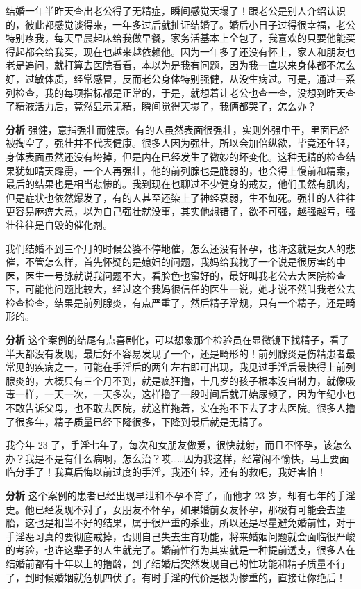 \begin{case}[不孕不育]
    结婚一年半昨天查出老公得了无精症，瞬间感觉天塌了！跟老公是别人介绍认识的，彼此都感觉谈得来，一年多过后就扯证结婚了。婚后小日子过得很幸福，老公特别疼我，每天早晨起床给我做早餐，家务活基本上全包了，我喜欢的只要他能买得起都会给我买，现在也越来越依赖他。因为一年多了还没有怀上，家人和朋友也老是追问，就打算去医院看看，本以为是我有问题，因为我一直以来身体都不怎么好，过敏体质，经常感冒，反而老公身体特别强健，从没生病过。可是，通过一系列检查，我的每项指标都是正常的，于是，就想着让老公也查一查，没想到昨天查了精液活力后，竟然显示无精，瞬间觉得天塌了，我俩都哭了，怎么办？

    \textbf{分析} 强健，意指强壮而健康。有的人虽然表面很强壮，实则外强中干，里面已经被掏空了，强壮并不代表健康。很多人因为强壮，所以会加倍纵欲，毕竟还年轻，身体表面虽然还没有垮掉，但是内在已经发生了微妙的坏变化。这种无精的检查结果犹如晴天霹雳，一个人再强壮，他的前列腺也是脆弱的，也会得上慢前和精索，最后的结果也是相当悲惨的。我到现在也聊过不少健身的戒友，他们虽然有肌肉，但是症状也依然爆发了，有的人甚至还染上了神经衰弱，生不如死。强壮的人往往更容易麻痹大意，以为自己强壮就没事，其实他想错了，欲不可强，越强越亏，强壮往往是自毁的催化剂。
\end{case}

\begin{case}[不孕不育]
    我们结婚不到三个月的时候公婆不停地催，怎么还没有怀孕，也许这就是女人的悲催，不管怎么样，首先怀疑的是媳妇的问题，我妈给我找了一个说是很厉害的中医，医生一号脉就说我问题不大，看脸色也蛮好的，最好叫我老公去大医院检查下，可能他问题比较大，经过这个我妈很信任的医生一说，她才说不然叫我老公去检查检查，结果是前列腺炎，有点严重了，然后精子常规，只有一个精子，还是畸形的。

    \textbf{分析} 这个案例的结尾有点喜剧化，可以想象那个检验员在显微镜下找精子，看了半天都没有发现，最后好不容易发现了一个，还是畸形的！前列腺炎是伤精患者最常见的疾病之一，可能在手淫后的两年左右即可出现，我见过手淫后最快得上前列腺炎的，大概只有三个月不到，就是疯狂撸，十几岁的孩子根本没自制力，就像吸毒一样，一天一次，一天多次，这样撸了一段时间后就开始尿频了，因为年纪小也不敢告诉父母，也不敢去医院，就这样拖着，实在拖不下去了才去医院。很多人撸了很多年，精子质量已经下降很多，下降到最后就是无精了。
\end{case}

\begin{case}[不孕不育]
    我今年 23 了，手淫七年了，每次和女朋友做爱，很快就射，而且不怀孕，该怎么办？我是不是有什么病啊，怎么治？哎……因为我这样，经常闹不愉快，马上要面临分手了！我真后悔以前过度的手淫，我还年轻，还有的救吧，我好害怕！

    \textbf{分析} 这个案例的患者已经出现早泄和不孕不育了，而他才 23 岁，却有七年的手淫史。他已经发现不对了，女朋友不怀孕，如果婚前女友怀孕，那极有可能会去堕胎，这也是相当不好的结果，属于很严重的杀业，所以还是尽量避免婚前性，对于手淫恶习真的要彻底戒掉，否则自己失去生育功能，将来婚姻问题就会面临很严峻的考验，也许这辈子的人生就完了。婚前性行为其实就是一种提前透支，很多人在结婚前都有十年以上的撸龄，到了结婚后突然发现自己的性功能和精子质量不行了，到时候婚姻就危机四伏了。有时手淫的代价是极为惨重的，直接让你绝后！
\end{case}

